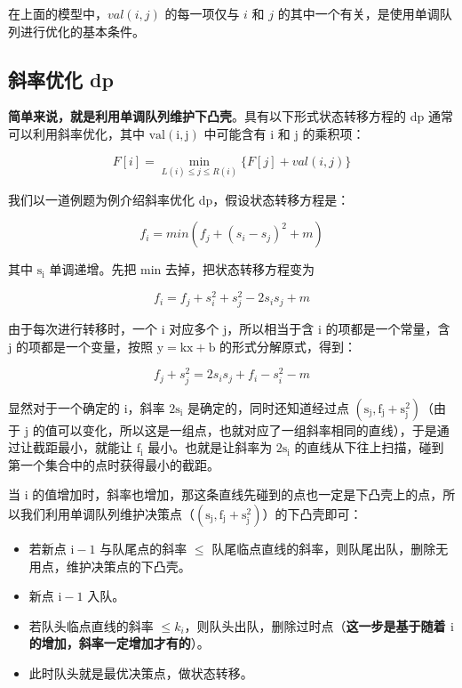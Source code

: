 \documentclass[UTF8]{article}
\begin{document}
在上面的模型中，$val(i, j)$ 的每一项仅与 $i$ 和 $j$ 的其中一个有关，是使用单调队列进行优化的基本条件。


\subsection{斜率优化 dp}
\textbf{简单来说，就是利用单调队列维护下凸壳}。具有以下形式状态转移方程的 dp 通常可以利用斜率优化，其中 $\mathrm{val(i, j)}$ 中可能含有 $\mathrm{i}$ 和 $\mathrm{j}$ 的乘积项：

$$
F[i] = \min\limits_{L(i) \le j \le R(i)} \{F[j] + val(i, j)\}
$$

我们以一道例题为例介绍斜率优化 dp，假设状态转移方程是：

$$
f_i = min(f_j + (s_i - s_j)^2 +m)
$$

其中 $\mathrm{s_i}$ 单调递增。先把 min 去掉，把状态转移方程变为

$$
f_i = f_j + s_i^2 + s_j^2 - 2s_is_j + m
$$

由于每次进行转移时，一个 $\mathrm{i}$ 对应多个 $\mathrm{j}$，所以相当于含 $\mathrm{i}$ 的项都是一个常量，含 $\mathrm{j}$ 的项都是一个变量，按照 $\mathrm{y = kx + b}$ 的形式分解原式，得到：

$$
f_j + s_j^2 = 2s_is_j + f_i - s_i^2 - m
$$

显然对于一个确定的 $\mathrm{i}$，斜率 $\mathrm{2s_i}$ 是确定的，同时还知道经过点 $\mathrm{(s_j, f_j + s_j ^ 2)}$（由于 $\mathrm{j}$ 的值可以变化，所以这是一组点，也就对应了一组斜率相同的直线），于是通过让截距最小，就能让 $\mathrm{f_i}$ 最小。也就是让斜率为 $\mathrm{2s_i}$ 的直线从下往上扫描，碰到第一个集合中的点时获得最小的截距。

当 $\mathrm{i}$ 的值增加时，斜率也增加，那这条直线先碰到的点也一定是下凸壳上的点，所以我们利用单调队列维护决策点（$\mathrm{(s_j, f_j + s_j ^ 2)}$）的下凸壳即可：

\begin{itemize}
	\item 若新点 $\mathrm{i - 1}$ 与队尾点的斜率 $\le$ 队尾临点直线的斜率，则队尾出队，删除无用点，维护决策点的下凸壳。
	\item 新点 $\mathrm{i - 1}$ 入队。
	\item 若队头临点直线的斜率 $\le k_i$，则队头出队，删除过时点（\textbf{这一步是基于随着 $\mathrm{i}$ 的增加，斜率一定增加才有的}）。
	\item 此时队头就是最优决策点，做状态转移。 
\end{itemize}
\end{document}
